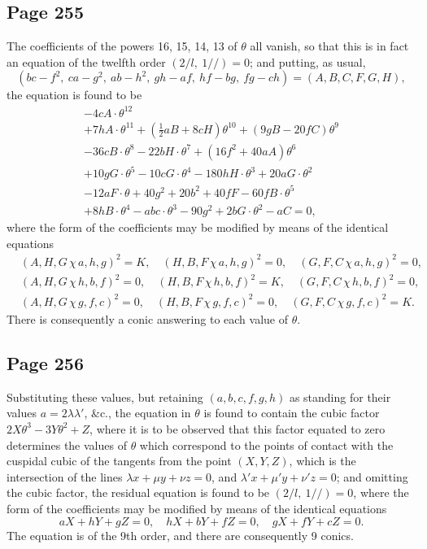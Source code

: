 \documentclass[11pt,a4paper]{article}
\theoremstyle{definition}
\begin{document}
\subsection*{Page 255}

The coefficients of the powers 16, 15, 14, 13 of $\theta$ all vanish, so that this is in fact an equation of the twelfth order $(2/l,\ 1//) = 0$; and putting, as usual,
\[
(bc - f^2,\ ca - g^2,\ ab - h^2,\ gh - af,\ hf - bg,\ fg - ch) = (A, B, C, F, G, H),
\]
the equation is found to be
\begin{gather*}
-4cA \cdot \theta^{12}\\
+ 7hA \cdot \theta^{11} + (\tfrac{1}{2}aB + 8cH)\theta^{10} + (9gB - 20fC)\theta^9\\
- 36cB \cdot \theta^8 - 22bH \cdot \theta^7 + (16f^2 + 40aA)\theta^6\\
+ 10gG \cdot \theta^5 - 10cG \cdot \theta^4 - 180hH \cdot \theta^3 + 20aG \cdot \theta^2\\
- 12aF \cdot \theta + 40g^2 + 20b^2 + 40fF - 60fB \cdot \theta^5\\
+ 8hB \cdot \theta^4 - abc \cdot \theta^3 - 90g^2 + 2bG \cdot \theta^2 - aC = 0,
\end{gather*}
where the form of the coefficients may be modified by means of the identical equations
\begin{align*}
&(A, H, G \,\chi\, a, h, g)^2 = K, \quad (H, B, F \,\chi\, a, h, g)^2 = 0, \quad (G, F, C \,\chi\, a, h, g)^2 = 0,\\
&(A, H, G \,\chi\, h, b, f)^2 = 0, \quad (H, B, F \,\chi\, h, b, f)^2 = K, \quad (G, F, C \,\chi\, h, b, f)^2 = 0,\\
&(A, H, G \,\chi\, g, f, c)^2 = 0, \quad (H, B, F \,\chi\, g, f, c)^2 = 0, \quad (G, F, C \,\chi\, g, f, c)^2 = K.
\end{align*}
There is consequently a conic answering to each value of $\theta$.

\subsection*{Page 256}

Substituting these values, but retaining $(a, b, c, f, g, h)$ as standing for their values $a = 2\lambda\lambda'$, \&c., the equation in $\theta$ is found to contain the cubic factor $2X\theta^3 - 3Y\theta^2 + Z$, where it is to be observed that this factor equated to zero determines the values of $\theta$ which correspond to the points of contact with the cuspidal cubic of the tangents from the point $(X, Y, Z)$, which is the intersection of the lines $\lambda x + \mu y + \nu z = 0$, and $\lambda' x + \mu' y + \nu' z = 0$; and omitting the cubic factor, the residual equation is found to be $(2/l,\ 1//) = 0$, where the form of the coefficients may be modified by means of the identical equations
\[
aX + hY + gZ = 0, \quad hX + bY + fZ = 0, \quad gX + fY + cZ = 0.
\]
The equation is of the 9th order, and there are consequently 9 conics.
\end{document}
